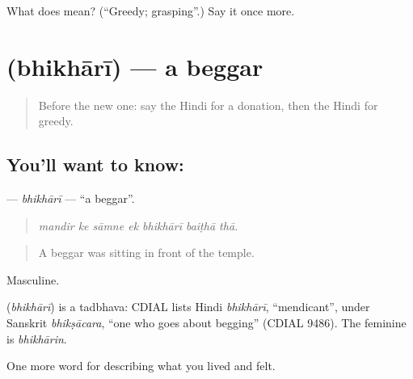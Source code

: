 \begin{tcolorbox}[breakable,colback=teal!4,colframe=teal!35!black,title={Before you move on}]
What does  mean? (\textquotedblleft{}Greedy; grasping\textquotedblright{}.) Say it once more.
\end{tcolorbox}
\section[\texorpdfstring{\hi{भिखारी} (bhikhārī)}{भिखारी (bhikhārī)}]{ (bhikhārī) — a beggar}

\label{lesson:HI-C469-bhikhari}



\begin{quote}
Before the new one: say the Hindi for a donation, then the Hindi for greedy.
\end{quote}

\subsection*{You'll want to know: }
\textbf{} — \emph{bhikhārī} — \textquotedblleft{}a beggar\textquotedblright{}.

\begin{quote}
      
\end{quote}

\begin{quote}
\emph{mandir ke sāmne ek bhikhārī baiṭhā thā.}
\end{quote}

\begin{quote}
A beggar was sitting in front of the temple.
\end{quote}

Masculine.

\begin{cousinweb}
\textbf{} (\emph{bhikhārī}) is a tadbhava: CDIAL lists Hindi \emph{bhikhārī}, \textquotedblleft{}mendicant\textquotedblright{}, under Sanskrit \emph{bhikṣācara}, \textquotedblleft{}one who goes about begging\textquotedblright{} (CDIAL 9486). The feminine is \emph{bhikhārin}.
\end{cousinweb}

\begin{grammarlens}[title={What you've built}]
One more word for describing what you lived and felt.
\end{grammarlens}


